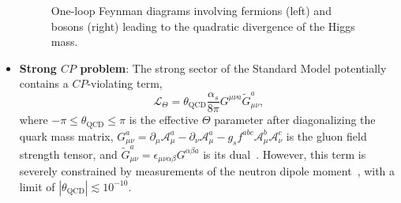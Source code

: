 \begin{itemize}
	\begin{figure}[htbp]
		\centering
		\hfill
		\hfill
		\hfill
		\caption{One-loop Feynman diagrams involving fermions (left) and bosons (right) leading to the quadratic divergence of the Higgs mass.}
		\label{fig:higgs-mass-feyman-diagrams}
	\end{figure}
	

	\item \textbf{Strong $CP$ problem}: The strong sector of the Standard Model potentially contains a $CP$-violating term, 
	\begin{equation}
		\mathcal{L}_{\Theta}=\theta_{\mathrm{QCD}} \frac{\alpha_s}{8\pi}G^{\mu \nu a} \tilde{G}^{a}_{\mu\nu},
	\end{equation}
	where $-\pi\leq\theta_{\mathrm{QCD}}\leq\pi$ is the effective $\Theta$ parameter after diagonalizing the quark mass matrix, $G^{a}_{\mu\nu}=\partial_{\mu}\mathcal{A}_{\mu}^{a}-\partial_{\nu}\mathcal{A}_{\mu}^{a} - g_s f^{abc}\mathcal{A}_{\mu}^{b} \mathcal{A}_{\nu}^{c}$ is the gluon field strength tensor, and $\tilde{G}^a_{\mu\nu}=\epsilon_{\mu\nu\alpha\beta}G^{\alpha\beta a}$ is its dual~\cite{pdg}. However, this term is severely constrained by measurements of the neutron dipole moment~\cite{PhysRevLett.97.131801}, with a limit of $|\theta_{\mathrm{QCD}}|\lesssim 10^{-10}$. 


\end{itemize}
